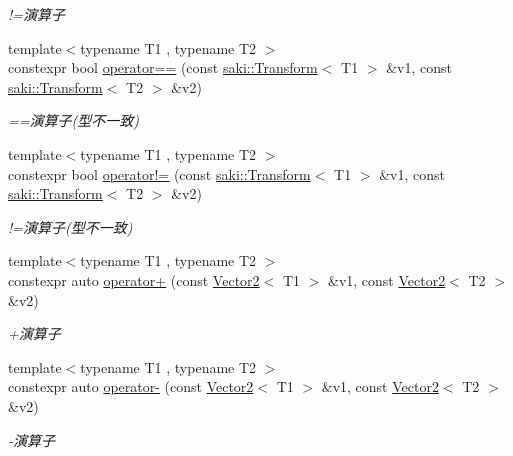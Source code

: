\begin{DoxyCompactItemize}
\begin{DoxyCompactList}\small\item\em !=演算子 \end{DoxyCompactList}\item 
{\footnotesize template$<$typename T1 , typename T2 $>$ }\\constexpr bool \mbox{\hyperlink{namespacesaki_a2caa00a8041e5dd4da3baf2e2575a980}{operator==}} (const \mbox{\hyperlink{classsaki_1_1_transform}{saki\+::\+Transform}}$<$ T1 $>$ \&v1, const \mbox{\hyperlink{classsaki_1_1_transform}{saki\+::\+Transform}}$<$ T2 $>$ \&v2)
\begin{DoxyCompactList}\small\item\em ==演算子(型不一致) \end{DoxyCompactList}\item 
{\footnotesize template$<$typename T1 , typename T2 $>$ }\\constexpr bool \mbox{\hyperlink{namespacesaki_abacbb997c38e24f818c0b63d26267aa3}{operator!=}} (const \mbox{\hyperlink{classsaki_1_1_transform}{saki\+::\+Transform}}$<$ T1 $>$ \&v1, const \mbox{\hyperlink{classsaki_1_1_transform}{saki\+::\+Transform}}$<$ T2 $>$ \&v2)
\begin{DoxyCompactList}\small\item\em !=演算子(型不一致) \end{DoxyCompactList}\item 
{\footnotesize template$<$typename T1 , typename T2 $>$ }\\constexpr auto \mbox{\hyperlink{namespacesaki_afa72a33da6ac050bfd8e91b9eae1422a}{operator+}} (const \mbox{\hyperlink{classsaki_1_1_vector2}{Vector2}}$<$ T1 $>$ \&v1, const \mbox{\hyperlink{classsaki_1_1_vector2}{Vector2}}$<$ T2 $>$ \&v2)
\begin{DoxyCompactList}\small\item\em +演算子 \end{DoxyCompactList}\item 
{\footnotesize template$<$typename T1 , typename T2 $>$ }\\constexpr auto \mbox{\hyperlink{namespacesaki_a4b1f99c0832914f9a23e0672cf9fd0fa}{operator-\/}} (const \mbox{\hyperlink{classsaki_1_1_vector2}{Vector2}}$<$ T1 $>$ \&v1, const \mbox{\hyperlink{classsaki_1_1_vector2}{Vector2}}$<$ T2 $>$ \&v2)
\begin{DoxyCompactList}\small\item\em -\/演算子 \end{DoxyCompactList}\item 

\end{DoxyCompactItemize}
